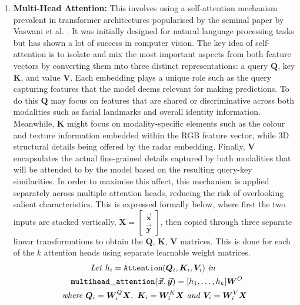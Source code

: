 \documentclass{mpaper}
\begin{document}
\begin{enumerate}
    \item \textbf{Multi-Head Attention:} This involves using a self-attention mechanism prevalent in transformer architectures popularised by the seminal paper by Vaswani et al. \cite{vaswani2017attention}. It was initially designed for natural language processing tasks but has shown a lot of success in computer vision. The key idea of self-attention is to isolate and mix the most important aspects from both feature vectors by converting them into three distinct representations: a query $\bm{Q}$, key $\bm{K}$, and value $\bm{V}$. Each embedding plays a unique role such as the query capturing features that the model deems relevant for making predictions. To do this $\bm{Q}$ may focus on features that are shared or discriminative across both modalities such as facial landmarks and overall identity information. Meanwhile, $\bm{K}$ might focus on modality-specific elements such as the colour and texture information embedded within the RGB feature vector, while 3D structural details being offered by the radar embedding. Finally, $\bm{V}$ encapsulates the actual fine-grained details captured by both modalities that will be attended to by the model based on the resulting query-key similarities. In order to maximise this affect, this mechanism is applied separately across multiple attention heads, reducing the risk of overlooking salient characteristics.
    This is expressed formally below, where first the two inputs are stacked vertically, $\bm{X} = \begin{bmatrix} \bm{\vec{x}} \\ \bm{\vec{y}} \end{bmatrix}$, then copied through three separate linear transformations to obtain the $\bm{Q}$, $\bm{K}$, $\bm{V}$ matrices. This is done for each of the $k$ attention heads using separate learnable weight matrices.
    \begin{align*}
        \mathit{Let} \ h_i = \mathtt{Attention}(\bm{Q}_i&, \bm{K}_i, \bm{V}_i) \ \mathit{in} \\
        \hspace{-1cm}\mathtt{multihead\_attention}(\bm{\vec{x}}, \bm{\vec{y}}) &= [h_1, \ldots, h_k]\bm{W}^O \\
        \mathit{where} \ 
        \bm{Q}_i = \bm{W}^{Q}_i\bm{X}, \ \bm{K}_i = \bm{W}^{K}_i&\bm{X} \ \mathit{and} \ \bm{V}_i = \bm{W}^{V}_i\bm{X}
    \end{align*}
\end{enumerate}
\end{document}
